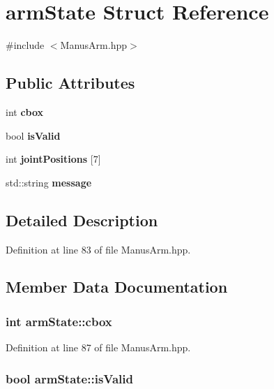 \section{arm\-State \-Struct \-Reference}
\label{structarmState}


{\ttfamily \#include $<$\-Manus\-Arm.\-hpp$>$}

\subsection*{\-Public \-Attributes}
\begin{DoxyCompactItemize}
\item 
int {\bf cbox}
\item 
bool {\bf is\-Valid}
\item 
int {\bf joint\-Positions} [7]
\item 
std\-::string {\bf message}
\end{DoxyCompactItemize}


\subsection{\-Detailed \-Description}


\-Definition at line 83 of file \-Manus\-Arm.\-hpp.



\subsection{\-Member \-Data \-Documentation}
\subsubsection[{cbox}]{\setlength{\rightskip}{0pt plus 5cm}int {\bf arm\-State\-::cbox}}\label{structarmState_a1fc8092eb5a00eb0fde26a2bf8110344}


\-Definition at line 87 of file \-Manus\-Arm.\-hpp.

\subsubsection[{is\-Valid}]{\setlength{\rightskip}{0pt plus 5cm}bool {\bf arm\-State\-::is\-Valid}}\label{structarmState_ad1648fd84fe049f22366eb1152e312c6}



